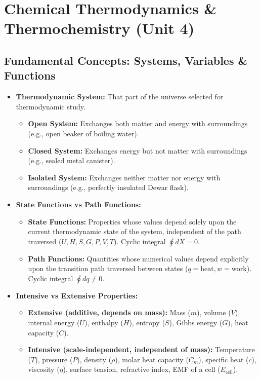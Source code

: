 \documentclass[10pt,twoside,openright]{book}
\begin{document}
\section{Chemical Thermodynamics \& Thermochemistry (Unit 4)}

\subsection{Fundamental Concepts: Systems, Variables \& Functions}
\begin{itemize}
  \item \textbf{Thermodynamic System:} That part of the universe selected for thermodynamic study.
  \begin{itemize}
    \item \textbf{Open System:} Exchanges both matter and energy with surroundings (e.g., open beaker of boiling water).
    \item \textbf{Closed System:} Exchanges energy but not matter with surroundings (e.g., sealed metal canister).
    \item \textbf{Isolated System:} Exchanges neither matter nor energy with surroundings (e.g., perfectly insulated Dewar flask).
  \end{itemize}
  \item \textbf{State Functions vs Path Functions:}
  \begin{itemize}
    \item \textbf{State Functions:} Properties whose values depend solely upon the current thermodynamic state of the system, independent of the path traversed ($U, H, S, G, P, V, T$). Cyclic integral $\oint dX = 0$.
    \item \textbf{Path Functions:} Quantities whose numerical values depend explicitly upon the transition path traversed between states ($q = \text{heat}, w = \text{work}$). Cyclic integral $\oint dq \ne 0$.
  \end{itemize}
  \item \textbf{Intensive vs Extensive Properties:}
  \begin{itemize}
    \item \textbf{Extensive (additive, depends on mass):} Mass ($m$), volume ($V$), internal energy ($U$), enthalpy ($H$), entropy ($S$), Gibbs energy ($G$), heat capacity ($C$).
    \item \textbf{Intensive (scale-independent, independent of mass):} Temperature ($T$), pressure ($P$), density ($\rho$), molar heat capacity ($C_m$), specific heat ($c$), viscosity ($\eta$), surface tension, refractive index, EMF of a cell ($E_{\text{cell}}$).
  \end{itemize}
\end{itemize}
\end{document}
